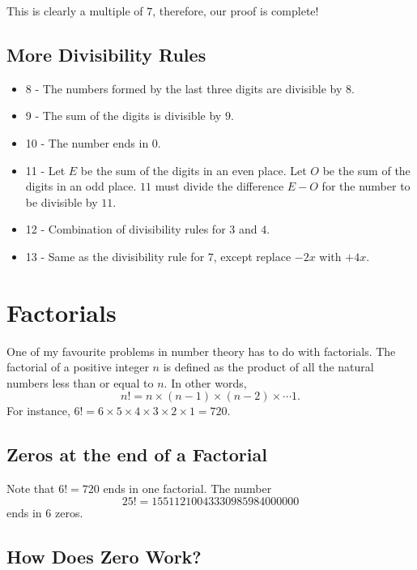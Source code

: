 This is clearly a multiple of $7$, therefore, our proof is complete!  





\clearpage

\subsection{More Divisibility Rules}

\begin{itemize}
	\item  8 - The numbers formed by the last three digits are divisible by $8$.
	\item 9 - The sum of the digits is divisible by $9$.
	\item 10 - The number ends in $0$.
	\item 11 - Let $E$ be the sum of the digits in an even place. Let $O$ be the sum of the digits in an odd place. $11$ must divide the difference $E-O$ for the number to be divisible by $11$.
	\item 12 - Combination of divisibility rules for $3$ and $4$.
	\item 13 -  Same as the divisibility rule for $7$, except replace $-2x$ with $+4x$.  
\end{itemize}

\section{Factorials}

One of my favourite problems in number theory has to do with factorials. The factorial of a positive integer $n$ is defined as the product of all the natural numbers less than or equal to $n$. In other words, $$n!=n\times (n-1)\times (n-2)\times \cdots 1.$$  For instance, $6!=6\times 5\times 4\times 3\times 2\times 1=720$.

\subsection{Zeros at the end of a Factorial}

Note that $6!=720$ ends in one factorial.  The number $$25!=15511210043330985984000000$$ ends in $6$ zeros. 

\clearpage 

\subsection*{How Does Zero Work?}


